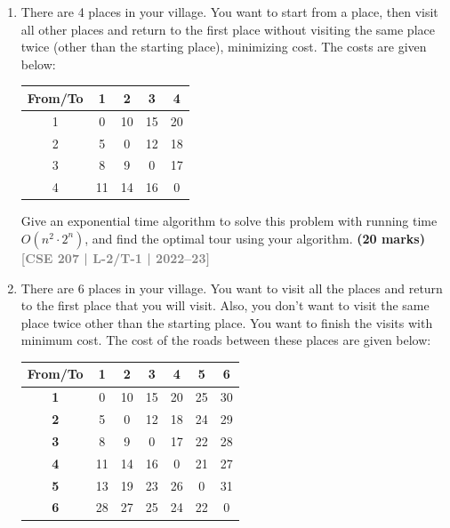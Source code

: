 \documentclass[12pt]{article}
\newcommand{\yr}[1]{\hfill\textcolor{gray}{\small\textbf{[#1]}}}
\newcommand{\mk}[1]{\textcolor{orange!70!black}{\small\textbf{(#1 marks)}}}
\begin{document}
\begin{enumerate}
\item There are 4 places in your village. You want to start from a place, then visit all other places and return to the first place without visiting the same place twice (other than the starting place), minimizing cost. The costs are given below:
\begin{center}
\begin{tabular}{|c|c|c|c|c|}
\hline
\textbf{From/To} & \textbf{1} & \textbf{2} & \textbf{3} & \textbf{4} \\
\hline
1 & 0  & 10 & 15 & 20 \\
2 & 5  & 0  & 12 & 18 \\
3 & 8  & 9  & 0  & 17 \\
4 & 11 & 14 & 16 & 0  \\
\hline
\end{tabular}
\end{center}
Give an exponential time algorithm to solve this problem with running time $O(n^2 \cdot 2^n)$, and find the optimal tour using your algorithm.
\mk{20} \yr{CSE 207 | L-2/T-1 | 2022--23}


\item There are 6 places in your village. You want to visit all the places and return to 
    the first place that you will visit. Also, you don't want to visit the same place twice 
    other than the starting place. You want to finish the visits with minimum cost. The 
    cost of the roads between these places are given below:
    
    \begin{center}
    \begin{tabular}{|c|c|c|c|c|c|c|}
    \hline
    \textbf{From/To} & \textbf{1} & \textbf{2} & \textbf{3} & \textbf{4} & \textbf{5} & \textbf{6} \\ \hline
    \textbf{1}       & 0          & 10         & 15         & 20         & 25         & 30         \\ \hline
    \textbf{2}       & 5          & 0          & 12         & 18         & 24         & 29         \\ \hline
    \textbf{3}       & 8          & 9          & 0          & 17         & 22         & 28         \\ \hline
    \textbf{4}       & 11         & 14         & 16         & 0          & 21         & 27         \\ \hline
    \textbf{5}       & 13         & 19         & 23         & 26         & 0          & 31         \\ \hline
    \textbf{6}       & 28         & 27         & 25         & 24         & 22         & 0          \\ \hline
    \end{tabular}
    \end{center}


\end{enumerate}
\end{document}
